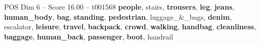 \begin{textsample}{POS Dim 6 – Score 16.00 – t001568}  \label{ex:f6_pos_017}
\textbf{people}, stairs, \textbf{trousers}, \textbf{leg}, \textbf{jeans}, \textbf{human\_body}, \textbf{bag}, \textbf{standing}, \textbf{pedestrian}, luggage\_\&\_bags, \textbf{denim}, escalator, \textbf{leisure}, \textbf{travel}, \textbf{backpack}, \textbf{crowd}, \textbf{walking}, \textbf{handbag}, \textbf{cleanliness}, \textbf{baggage}, \textbf{human\_back}, \textbf{passenger}, \textbf{boot}, handrail

\end{textsample}
